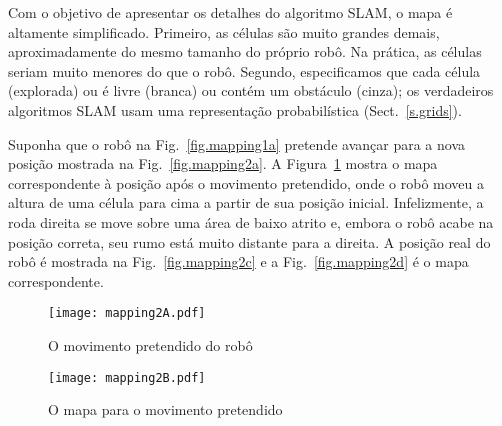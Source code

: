 Com o objetivo de apresentar os detalhes do algoritmo SLAM, o mapa é altamente simplificado. Primeiro, as células são muito grandes demais, aproximadamente do mesmo tamanho do próprio robô. Na prática, as células seriam muito menores do que o robô. Segundo, especificamos que cada célula (explorada) ou é livre (branca) ou contém um obstáculo (cinza); os verdadeiros algoritmos SLAM usam uma representação probabilística (Sect.~\ref{s.grids}).

Suponha que o robô na Fig.~\ref{fig.mapping1a} pretende avançar para a nova posição mostrada na Fig.~\ref{fig.mapping2a}. A Figura~\ref{fig.mapping2b} mostra o mapa correspondente à posição após o movimento pretendido, onde o robô moveu a altura de uma célula para cima a partir de sua posição inicial. Infelizmente, a roda direita se move sobre uma área de baixo atrito e, embora o robô acabe na posição correta, seu rumo está muito distante para a direita. A posição real do robô é mostrada na Fig.~\ref{fig.mapping2c} e a Fig.~\ref{fig.mapping2d} é o mapa correspondente.

\begin{figure}
\begin{minipage}{.45\textwidth}
\texttt{[image: mapping2A.pdf]}
\caption{O movimento pretendido do robô}
\label{fig.mapping2a}
\end{minipage}
\hspace{\fill}
\begin{minipage}{.45\textwidth}
\texttt{[image: mapping2B.pdf]}
\caption{O mapa para o movimento pretendido}
\label{fig.mapping2b}
\end{minipage}
\end{figure}

